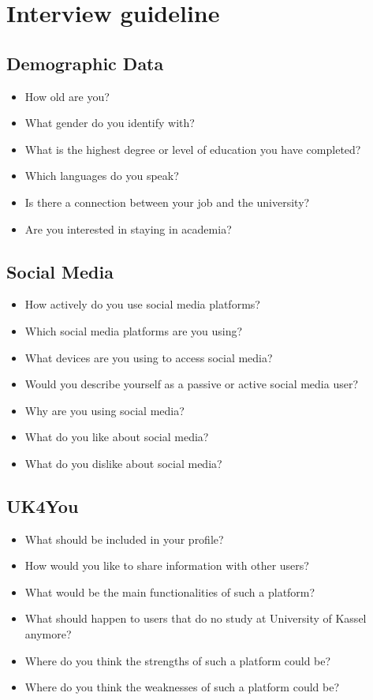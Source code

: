 \section{Interview guideline} \label{sec:guideline}
\subsection{Demographic Data}
\begin{itemize}
    \item How old are you?
    \item What gender do you identify with?
    \item What is the highest degree or level of education you have completed?
    \item Which languages do you speak?
    \item Is there a connection between your job and the university?
    \item Are you interested in staying in academia?
\end{itemize}

\subsection{Social Media}
\begin{itemize}
    \item How actively do you use social media platforms?
    \item Which social media platforms are you using?
    \item What devices are you using to access social media?
    \item Would you describe yourself as a passive or active social media user?
    \item Why are you using social media?
    \item What do you like about social media?
    \item What do you dislike about social media?
\end{itemize}

\subsection{UK4You}
\begin{itemize}
    \item What should be included in your profile?
    \item How would you like to share information with other users?
    \item What would be the main functionalities of such a platform?
    \item What should happen to users that do no study at University of Kassel anymore?
    \item Where do you think the strengths of such a platform could be?
    \item Where do you think the weaknesses of such a platform could be?
\end{itemize}